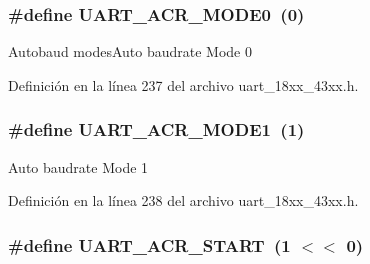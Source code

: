 \subsubsection[{\texorpdfstring{U\+A\+R\+T\+\_\+\+A\+C\+R\+\_\+\+M\+O\+D\+E0}{UART_ACR_MODE0}}]{\setlength{\rightskip}{0pt plus 5cm}\#define U\+A\+R\+T\+\_\+\+A\+C\+R\+\_\+\+M\+O\+D\+E0~(0)}\hypertarget{group___u_a_r_t__18_x_x__43_x_x_ga31933a99dfe9a8afac45c1f26b0cf021}{}\label{group___u_a_r_t__18_x_x__43_x_x_ga31933a99dfe9a8afac45c1f26b0cf021}
Autobaud modes\+Auto baudrate Mode 0 

Definición en la línea 237 del archivo uart\+\_\+18xx\+\_\+43xx.\+h.

\subsubsection[{\texorpdfstring{U\+A\+R\+T\+\_\+\+A\+C\+R\+\_\+\+M\+O\+D\+E1}{UART_ACR_MODE1}}]{\setlength{\rightskip}{0pt plus 5cm}\#define U\+A\+R\+T\+\_\+\+A\+C\+R\+\_\+\+M\+O\+D\+E1~(1)}\hypertarget{group___u_a_r_t__18_x_x__43_x_x_ga25d690e49a3ccc696e031e8a1480dc1d}{}\label{group___u_a_r_t__18_x_x__43_x_x_ga25d690e49a3ccc696e031e8a1480dc1d}
Auto baudrate Mode 1 

Definición en la línea 238 del archivo uart\+\_\+18xx\+\_\+43xx.\+h.

\subsubsection[{\texorpdfstring{U\+A\+R\+T\+\_\+\+A\+C\+R\+\_\+\+S\+T\+A\+RT}{UART_ACR_START}}]{\setlength{\rightskip}{0pt plus 5cm}\#define U\+A\+R\+T\+\_\+\+A\+C\+R\+\_\+\+S\+T\+A\+RT~(1 $<$$<$ 0)}\hypertarget{group___u_a_r_t__18_x_x__43_x_x_gaf6a6a4cb65edff2871ba48d3f2b445dc}{}\label{group___u_a_r_t__18_x_x__43_x_x_gaf6a6a4cb65edff2871ba48d3f2b445dc}


